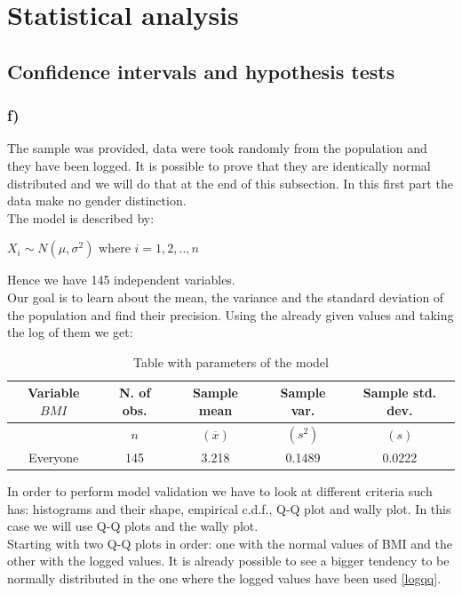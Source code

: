\section{Statistical analysis}
\subsection{Confidence intervals and hypothesis tests}

\subsubsection{f)}
The sample was provided, data were took randomly from the population and they have been logged. It is possible to prove that they are identically normal distributed and we will do that at the end of this subsection. In this first part the data make no gender distinction. \\
The model is described by:
\begin{center}
$ X_i \sim N(\mu,\sigma^2) $ where $i=1,2,..,n$ \\
\end{center}
Hence we have 145 independent variables. \\
Our goal is to learn about the mean, the variance and the standard deviation of the population and find their precision. Using the already given values and taking the log of them we get:
\begin{table}[h]
\centering
\begin{tabular}{|c||c|c|c|c|}
  \hline
 \parbox{1.5cm}{\textbf{Variable} $BMI$} & \textbf{N. of obs.} & \parbox{1.5cm}{\textbf{Sample mean}} & \parbox{1.5cm}{\textbf{Sample var.}} & \parbox{1.5cm}{\textbf{Sample std. dev.}} \\
 \hline
  & $n$ & $(\overline{x})$ & $(s^2)$ & $(s)$ \\
  \hline
  \hline
Everyone & 145 & 3.218 & 0.1489 & 0.0222  \\ 
  \hline
\end{tabular}
\caption{Table with parameters of the model}
\label{Table2}
\end{table}
In order to perform model validation we have to look at different criteria such has: histograms and their shape, empirical c.d.f., Q-Q plot and wally plot. In this case we will use Q-Q plots and the wally plot. \\
Starting with two Q-Q plots in order: one with the normal values of BMI and the other with the logged values. It is already possible to see a bigger tendency to be normally distributed in the one where the logged values have been used \ref{logqq}. \\
